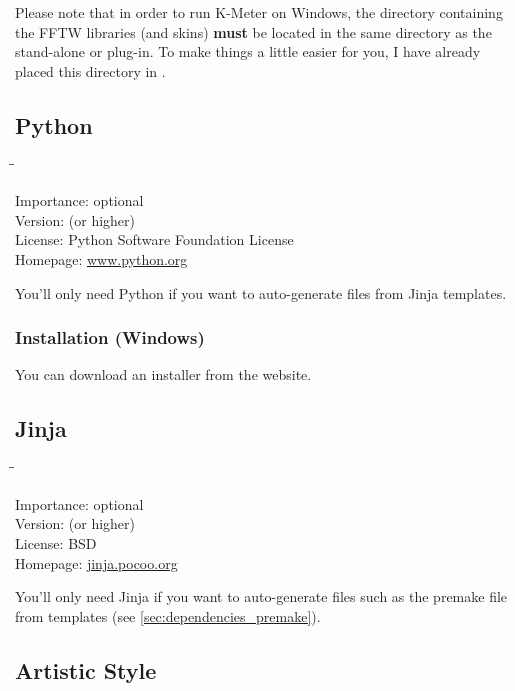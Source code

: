 Please note that in order to run K-Meter on Windows, the directory
 containing the FFTW libraries (and skins) \textbf{must}
be located in the same directory as the stand-alone or plug-in.  To
make things a little easier for you, I have already placed this
directory in .

\subsection{Python}

\begin{tabbing}
  \hspace*{6em}\=\=\kill

  Importance:  \> optional \\
  Version:      (or higher) \\
  License:     \> Python Software Foundation License \\
  Homepage:    \> \href{http://www.python.org/}{www.python.org}
\end{tabbing}

You'll only need Python if you want to auto-generate files from Jinja
templates.

\subsubsection{Installation (Windows)}

You can download an installer from the website.

\subsection{Jinja}

\begin{tabbing}
  \hspace*{6em}\=\=\kill

  Importance:  \> optional \\
  Version:      (or higher) \\
  License:     \> BSD \\
  Homepage:    \> \href{http://jinja.pocoo.org/}{jinja.pocoo.org}
\end{tabbing}

You'll only need Jinja if you want to auto-generate files such as the
premake file from templates (see \ref{sec:dependencies_premake}).

\subsection{Artistic Style}

